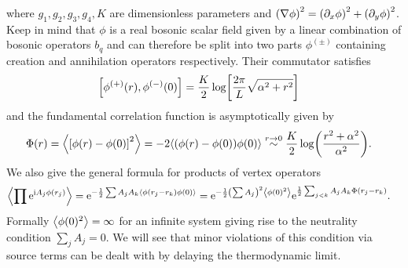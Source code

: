 \documentclass[english, parskip=full]{scrartcl}
\begin{document}
where $g_1,g_2,g_3,g_4,K$ are dimensionless parameters and $\kla*{\nabla\phi}^2 = \kla*{\partial_x\phi}^2 + \kla*{\partial_y\phi}^2$.
Keep in mind that $\phi$ is a real bosonic scalar field given by a linear combination of bosonic operators $b_q$ and can therefore be split into two parts $\phi^{(\pm)}$ containing creation and annihilation operators respectively.
Their commutator satisfies
\begin{align}
\klb*{\phi^{(+)}(r), \phi^{(-)}(0)} &= \frac{K}{2} \log\klb*{\frac{2\pi}{L} \sqrt{\alpha^2 + r^2}}
\end{align}
and the fundamental correlation function is asymptotically given by
\begin{align}
\Phi(r) &= \bra*{\klb*{\phi(r) - \phi(0)}^2} = -2 \bra*{\kla*{\phi(r) - \phi(0)} \phi(0)} \overset{r\rightarrow 0}{\sim} \frac{K}{2} \log\kla*{\frac{r^2 + \alpha^2}{\alpha^2}}.
\end{align}
We also give the general formula for products of vertex operators
\begin{align}
\bra*{\prod \powe{\i A_j\phi(r_j)}} &= \powe{-\frac{1}{2} \sum A_j A_k \bra*{\phi(r_j-r_k) \phi(0)}} = \powe{-\frac{1}{2} \kla*{\sum A_j}^2 \bra*{\phi(0)^2}} \powe{\frac{1}{2} \sum_{j<k} A_jA_k \Phi(r_j-r_k)}.
\end{align}
Formally $\bra*{\phi(0)^2}=\infty$ for an infinite system giving rise to the neutrality condition $\sum_j A_j =0$.
We will see that minor violations of this condition via source terms can be dealt with by delaying the thermodynamic limit.
\end{document}
